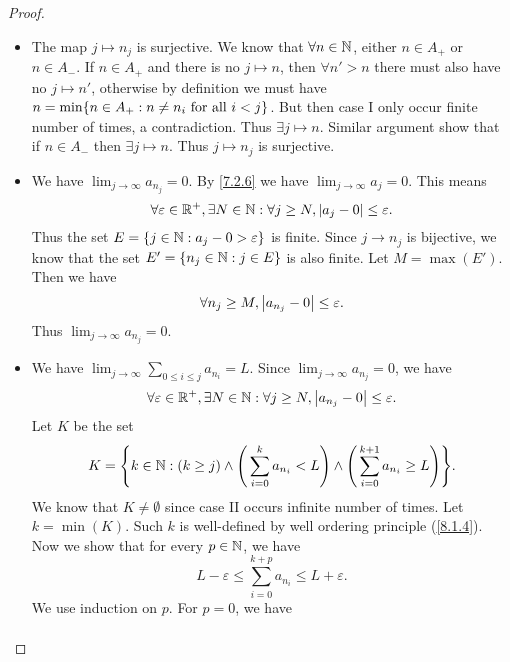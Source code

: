 \begin{proof}
\begin{itemize}
          But this means \(\sum_{n \in A_-} a_n\) is absolutely convergent, a contradiction.
          Thus case I occurs infinite number of times.
          Similar proof show that case II also occurs infinite number of times.
    \item The map \(j \mapsto n_j\) is surjective.
          We know that \(\forall n \in \mathbb{N}\), either \(n \in A_+\) or \(n \in A_-\).
          If \(n \in A_+\) and there is no \(j \mapsto n\), then \(\forall n' > n\) there must also have no \(j \mapsto n'\), otherwise by definition we must have \(n = \min\set{n \in A_+ : n \neq n_i \text{ for all } i < j}\).
          But then case I only occur finite number of times, a contradiction.
          Thus \(\exists j \mapsto n\).
          Similar argument show that if \(n \in A_-\) then \(\exists j \mapsto n\).
          Thus \(j \mapsto n_j\) is surjective.
    \item We have \(\lim_{j \to \infty} a_{n_j} = 0\).
          By \cref{7.2.6} we have \(\lim_{j \to \infty} a_j = 0\).
          This means
          \[
            \forall \varepsilon \in \mathbb{R}^+, \exists N \in \mathbb{N} : \forall j \geq N, \left\lvert a_j - 0\right\rvert \leq \varepsilon.
          \]
          Thus the set \(E = \left\lbrace j \in \mathbb{N} : a_j - 0 > \varepsilon\right\rbrace\) is finite.
          Since \(j \to n_j\) is bijective, we know that the set \(E' = \left\lbrace n_j \in \mathbb{N} : j \in E\right\rbrace\) is also finite.
          Let \(M = \max(E')\).
          Then we have
          \[
            \forall n_j \geq M, \left\lvert a_{n_j} - 0\right\rvert \leq \varepsilon.
          \]
          Thus \(\lim_{j \to \infty} a_{n_j} = 0\).
    \item We have \(\lim_{j \to \infty} \sum_{0 \leq i \leq j} a_{n_i} = L\).
          Since \(\lim_{j \to \infty} a_{n_j} = 0\), we have
          \[
            \forall \varepsilon \in \mathbb{R}^+, \exists N \in \mathbb{N} : \forall j \geq N, \left\lvert a_{n_j} - 0\right\rvert \leq \varepsilon.
          \]
          Let \(K\) be the set
          \[
            K = \set{k \in \N : (k \geq j) \land \Bigg(\sum_{i = 0}^k a_{n_i} < L\Bigg) \land \Bigg(\sum_{i = 0}^{k + 1} a_{n_i} \geq L\Bigg)}.
          \]
          We know that \(K \neq \emptyset\) since case II occurs infinite number of times.
          Let \(k = \min(K)\).
          Such \(k\) is well-defined by well ordering principle (\cref{8.1.4}).
          Now we show that for every \(p \in \mathbb{N}\), we have
          \[
            L - \varepsilon \leq \sum_{i = 0}^{k + p} a_{n_i} \leq L + \varepsilon.
          \]
          We use induction on \(p\).
          For \(p = 0\), we have
          \begin{align*}

\end{align*}
\end{itemize}
\end{proof}

